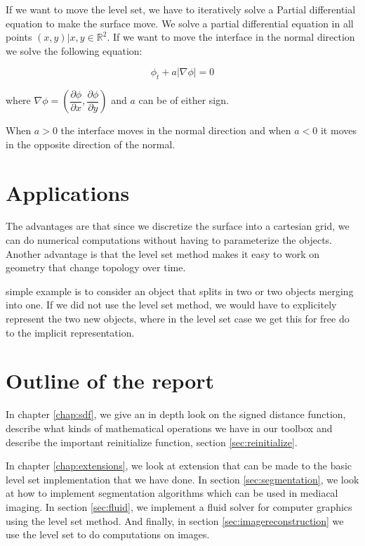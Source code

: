 If we want to move the level set, we have to iteratively solve a Partial
differential equation to make the surface move. We solve a partial
differential equation in all points $(x,y) | x,y \in
\mathbb{R}^{2}$. If we want to move the interface in the normal
direction we solve the following equation:

\begin{equation}
\phi_{t} + a|\nabla \phi| = 0
\end{equation}\label{eq:normMove}

where $\nabla \phi = (\dfrac{\partial \phi}{\partial x},
\dfrac{\partial \phi}{\partial y})$ and $a$ can be of either sign.

When $a > 0$ the interface moves in the normal direction and when $a <
0$ it moves in the opposite direction of the normal.


\section*{Applications}

The advantages are that since we discretize the surface into a
cartesian grid, we can do numerical computations without having to
parameterize the objects. Another advantage is that the level set
method makes it easy to work on geometry that change topology over
time.


simple example is to consider an object that splits in two or two
objects merging into one. If we did not use the level set method, we
would have to explicitely represent the two new objects, where in the
level set case we get this for free do to the implicit representation.


\newpage

\section*{Outline of the report}

In chapter \vref{chap:sdf}, we give an in depth look on the signed
distance function, describe what kinds of mathematical operations we
have in our toolbox and describe the important reinitialize function,
section \vref{sec:reinitialize}.

In chapter \vref{chap:extensions}, we look at extension that can be
made to the basic level set implementation that we have done. In
section \vref{sec:segmentation}, we look at how to implement
segmentation algorithms which can be used in mediacal imaging. In
section \vref{sec:fluid}, we implement a fluid solver for computer
graphics using the level set method. And finally, in section
\vref{sec:imagereconstruction}  we use the level set to do computations
on images.




